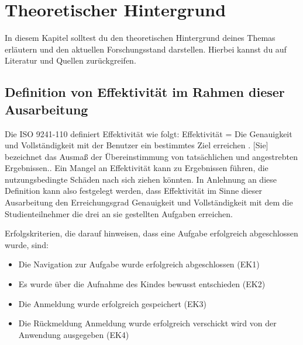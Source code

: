 \section{Theoretischer Hintergrund}
In diesem Kapitel solltest du den theoretischen Hintergrund deines Themas erläutern und den aktuellen Forschungsstand darstellen. Hierbei kannst du auf Literatur und Quellen zurückgreifen.

\subsection{Definition von Effektivität im Rahmen dieser Ausarbeitung }
Die ISO 9241-110 definiert Effektivität wie folgt: \glqq Effektivität = Die Genauigkeit und Vollständigkeit mit der Benutzer ein bestimmtes Ziel erreichen\grqq{} \cite{ISO-9241-110}. 
\grqq{}[Sie] bezeichnet das Ausmaß der Übereinstimmung von tatsächlichen und angestrebten Ergebnissen.\glqq \cite{iso-9241-11}. Ein \glqq Mangel an Effektivität kann zu Ergebnissen führen, die nutzungsbedingte Schäden nach sich ziehen könnten.\glqq \cite{iso-9241-11}
In Anlehnung an diese Definition kann also festgelegt werden, dass Effektivität im Sinne dieser Ausarbeitung den Erreichungsgrad Genauigkeit und Vollständigkeit mit dem die Studienteilnehmer die drei an sie gestellten Aufgaben erreichen. 

Erfolgskriterien, die darauf hinweisen, dass eine Aufgabe erfolgreich abgeschlossen wurde, sind: 
\begin{itemize}
    \item Die Navigation zur Aufgabe wurde erfolgreich abgeschlossen (EK1)
    \item Es wurde über die Aufnahme des Kindes bewusst entschieden (EK2)
    \item Die Anmeldung wurde erfolgreich gespeichert (EK3)
    \item Die Rückmeldung \glqq Anmeldung wurde erfolgreich verschickt\grqq{} wird von der Anwendung ausgegeben (EK4)
\end{itemize}

